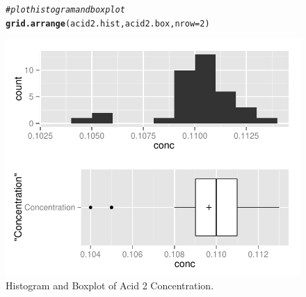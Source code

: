 \documentclass{article}\usepackage[]{graphicx}\usepackage[]{color}
\makeatletter
\def\maxwidth{ %
  \ifdim\Gin@nat@width>\linewidth
    \linewidth
  \else
    \Gin@nat@width
  \fi
}
\newcommand{\hlnum}[1]{\textcolor[rgb]{0.686,0.059,0.569}{#1}}%
\newcommand{\hlcom}[1]{\textcolor[rgb]{0.678,0.584,0.686}{\textit{#1}}}%
\newcommand{\hlstd}[1]{\textcolor[rgb]{0.345,0.345,0.345}{#1}}%
\newcommand{\hlkwc}[1]{\textcolor[rgb]{0.333,0.667,0.333}{#1}}%
\newcommand{\hlkwd}[1]{\textcolor[rgb]{0.737,0.353,0.396}{\textbf{#1}}}%
\newenvironment{kframe}{%
 \def\at@end@of@kframe{}%
 \ifinner\ifhmode%
  \def\at@end@of@kframe{\end{minipage}}%
  \begin{minipage}{\columnwidth}%
 \fi\fi%
 \def\FrameCommand##1{\hskip\@totalleftmargin \hskip-\fboxsep
 \colorbox{shadecolor}{##1}\hskip-\fboxsep
     \hskip-\linewidth \hskip-\@totalleftmargin \hskip\columnwidth}%
 \MakeFramed {\advance\hsize-\width
   \@totalleftmargin\z@ \linewidth\hsize
   \@setminipage}}%
 {\par\unskip\endMakeFramed%
 \at@end@of@kframe}
\newenvironment{knitrout}{}{} %
\makeatother
\begin{document}
\begin{figure}[H]  \begin{center}
\begin{knitrout}
\color{fgcolor}\begin{kframe}
\begin{alltt}
\hlcom{# plot histogram and boxplot}
\hlkwd{grid.arrange}\hlstd{(acid2.hist, acid2.box,} \hlkwc{nrow} \hlstd{=} \hlnum{2}\hlstd{)}
\end{alltt}
\end{kframe}
\includegraphics[width=\maxwidth]{figure/2_acid2_box_plot} 

\end{knitrout}
\end{center} \caption{Histogram and Boxplot of Acid 2 Concentration.} \end{figure}
\end{document}
